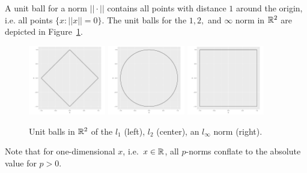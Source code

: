 \documentclass{article}
\begin{document}
A unit ball for a norm $||\cdot||$ contains all points with distance $1$ around the origin, i.e. all points $\{x: ||x|| = 0\}$. The unit balls for the $1, 2,$ and $\infty$ norm in $\mathbb{R}^2$ are depicted in Figure~\ref{fig:input}.
\begin{figure}[ht]
    \centering
    \includegraphics[width=0.3\textwidth]{unit_circle_1.pdf}
    \includegraphics[width=0.3\textwidth]{unit_circle_2.pdf}
    \includegraphics[width=0.3\textwidth]{unit_circle_inf.pdf}
    \caption{Unit balls in $\mathbb{R}^2$ of the $l_1$ (left), $l_2$ (center), an $l_\infty$ norm (right).}
    \label{fig:input}
\end{figure}
Note that for one-dimensional $x$, i.e.\ $x \in \mathbb{R}$, all $p$-norms conflate to the absolute value for $p > 0$.
\end{document}
